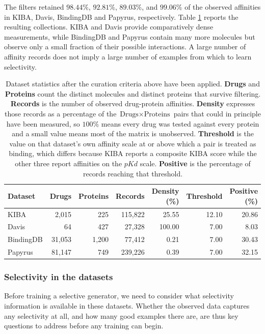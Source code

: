\documentclass[a4paper,12pt]{article}
\begin{document}
The filters retained $98.44\%$, $92.81\%$, $89.03\%$, and $99.06\%$ of the observed affinities in KIBA, Davis, BindingDB and Papyrus, respectively. Table \ref{tab:datasets} reports the resulting collections. KIBA and Davis provide comparatively dense measurements, while BindingDB and Papyrus contain many more molecules but observe only a small fraction of their possible interactions. A large number of affinity records does not imply a large number of examples from which to learn selectivity.

\begin{table}[H]
    \centering
    \caption[Dataset statistics after filtering.]{Dataset statistics after the curation
        criteria above have been applied. \textbf{Drugs} and \textbf{Proteins} count the distinct
        molecules and distinct proteins that survive filtering. \textbf{Records} is the number of observed drug-protein affinities.
        \textbf{Density} expresses those records as a percentage of the
        $\text{Drugs}\times\text{Proteins}$ pairs that could in principle have been measured, so
        $100\%$ means every drug was tested against every protein and a small value means most of
        the matrix is unobserved. \textbf{Threshold} is the value on that dataset's own affinity
        scale at or above which a pair is treated as binding, which differs because KIBA reports a
        composite KIBA score while the other three report affinities on the $pKd$ scale.
        \textbf{Positive} is the percentage of records reaching that threshold.}
    \label{tab:datasets}
    \begin{tabular}{lrrrrrr}
        \toprule
        \textbf{Dataset} & \textbf{Drugs} & \textbf{Proteins} & \textbf{Records} & \textbf{Density (\%)} & \textbf{Threshold}& \textbf{Positive (\%)} \\
        \midrule
        KIBA & 2,015 & 225 & 115,822 & 25.55 & 12.10 & 20.86 \\
        Davis & 64 & 427 & 27,328 & 100.00 & 7.00 & 8.03 \\
        BindingDB & 31,053 & 1,200 & 77,412 & 0.21 & 7.00 & 30.43 \\
        Papyrus & 81,147 & 749 & 239,226 & 0.39 & 7.00 & 32.15 \\
        \bottomrule
    \end{tabular}
\end{table}

\subsubsection{Selectivity in the datasets}
Before training a selective generator, we need to consider what selectivity information is available in these datasets. Whether the observed data captures any selectivity at all, and how many good examples there are, are thus key questions to address before any training can begin.
\end{document}
